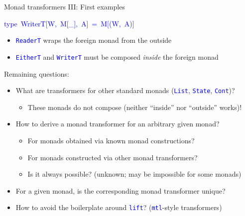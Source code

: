 \documentclass[english]{beamer}
\newenvironment{lyxcode}
  {\par\begin{list}{}{
    \setlength{\rightmargin}{\leftmargin}
    \setlength{\listparindent}{0pt}%
    \raggedright
    \setlength{\itemsep}{0pt}
    \setlength{\parsep}{0pt}
    \normalfont\ttfamily}%
   \def\{{\char`\{}
   \def\}{\char`\}}
   \def\textasciitilde{\char`\~}
   \item[]}
  {\end{list}}
\begin{document}
\begin{frame}{Monad transformers III: First examples}
\begin{lyxcode}
\textcolor{blue}{\footnotesize{}type~WriterT{[}W,~M{[}\_{]},~A{]}~=~M{[}(W,~A){]}}{\footnotesize\par}
\end{lyxcode}
\begin{itemize}
\item {\footnotesize{}\vspace{-0.2cm}}\texttt{\textcolor{blue}{\footnotesize{}ReaderT}}
wraps the foreign monad from the outside
\item \texttt{\textcolor{blue}{\footnotesize{}EitherT}} and \texttt{\textcolor{blue}{\footnotesize{}WriterT}}
must be composed \emph{inside} the foreign monad
\end{itemize}
{\footnotesize{}\vspace{-0.1cm}}Remaining questions:
\begin{itemize}
\item What are transformers for other standard monads (\texttt{\textcolor{blue}{\footnotesize{}List}},
\texttt{\textcolor{blue}{\footnotesize{}State}}, \texttt{\textcolor{blue}{\footnotesize{}Cont}})?
\begin{itemize}
\item These monads do not compose (neither ``inside'' nor ``outside''
works)!
\end{itemize}
\item How to derive a monad transformer for an arbitrary given monad?
\begin{itemize}
\item For monads obtained via known monad constructions?
\item For monads constructed via other monad transformers?
\item Is it always possible? (unknown; may be impossible for some monads)
\end{itemize}
\item For a given monad, is the corresponding monad transformer unique?
\item How to avoid the boilerplate around \texttt{\textcolor{blue}{\footnotesize{}lift}}?
(\texttt{\textcolor{blue}{\footnotesize{}mtl}}-style transformers)
\end{itemize}
\end{frame}
\end{document}
